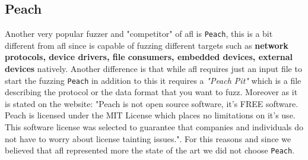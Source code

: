 \documentclass[../main.tex]{subfiles}
\begin{document}

\subsection{Peach}

Another very popular fuzzer and "competitor" of afl is \texttt{Peach}, this is a
bit different from afl since is capable of fuzzing different targets such as
\textbf{network protocols, device drivers, file consumers, embedded devices,
external devices} natively. Another difference is that while afl requires just
an input file to start the fuzzing \texttt{Peach} in addition to this it
requires a \textit{"Peach Pit"} which is a file describing the protocol or the
data format that you want to fuzz\cite{peach}. Moreover as it is stated on the
website: "Peach is not open source software, it’s FREE software. Peach is
licensed under the MIT License which places no limitations on it’s use. This
software license was selected to guarantee that companies and individuals do not
have to worry about license tainting issues."\cite{peachlicense}. For this
reasons and since we believed that afl represented more the state of the art we
did not choose \texttt{Peach}.
\end{document}

